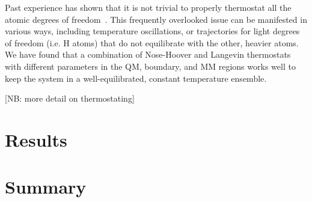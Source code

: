\documentclass[11pt]{revtex4}
\begin{document}
Past experience has shown that it is not trivial to properly
thermostat all the atomic degrees of freedom~\cite{winfield_thesis_2009a}.
This frequently overlooked issue can be manifested in various ways,
including temperature oscillations, or trajectories for light degrees
of freedom (i.e. H atoms) that do not equilibrate with the other,
heavier atoms.  We have found that a combination of Nose-Hoover and
Langevin thermostats with different parameters in the QM, boundary,
and MM regions works well to keep the system in a well-equilibrated,
constant temperature ensemble.

[NB: more detail on thermostating]

\section{Results}

\section{Summary}


\end{document}
